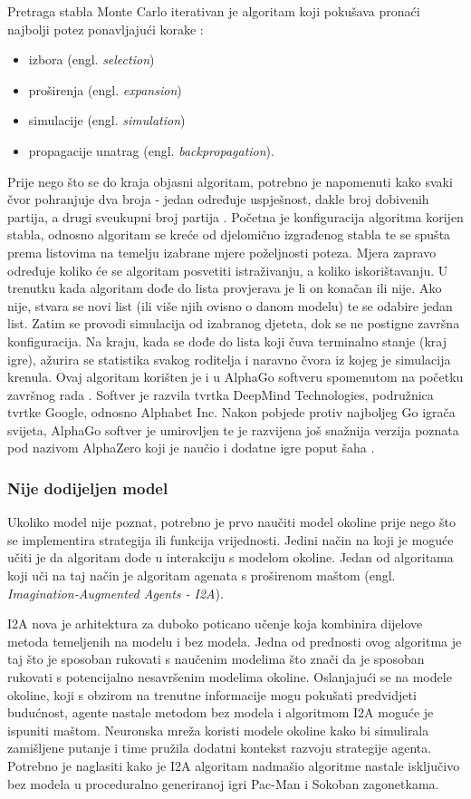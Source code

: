 \documentclass[]{foi} %
\begin{document}
Pretraga stabla Monte Carlo iterativan je algoritam koji pokušava pronaći najbolji potez ponavljajući korake \cite{mcts}:
\begin{itemize}
    \item izbora (engl. \textit{selection})
    \item proširenja (engl. \textit{expansion})
    \item simulacije (engl. \textit{simulation})
    \item propagacije unatrag (engl. \textit{backpropagation}).
\end{itemize}
Prije nego što se do kraja objasni algoritam, potrebno je napomenuti kako svaki čvor pohranjuje dva broja - jedan određuje uspješnost, dakle broj dobivenih partija, a drugi sveukupni broj partija \cite[str. 28]{ferMonte}. Početna je konfiguracija algoritma korijen stabla, odnosno algoritam se kreće od djelomično izgrađenog stabla te se spušta prema listovima na temelju izabrane mjere poželjnosti poteza. Mjera zapravo određuje koliko će se algoritam posvetiti istraživanju, a koliko iskorištavanju. U trenutku kada algoritam dođe do lista provjerava je li on konačan ili nije. Ako nije, stvara se novi list (ili više njih ovisno o danom modelu) te se odabire jedan list. Zatim se provodi simulacija od izabranog djeteta, dok se ne postigne završna konfiguracija. Na kraju, kada se dođe do lista koji čuva terminalno stanje (kraj igre), ažurira se statistika svakog roditelja i naravno čvora iz kojeg je simulacija krenula. Ovaj algoritam korišten je i u AlphaGo softveru spomenutom na početku završnog rada \cite{modeli}. Softver je razvila tvrtka DeepMind Technologies, podružnica tvrtke Google, odnosno Alphabet Inc. Nakon pobjede protiv najboljeg Go igrača svijeta, AlphaGo softver je umirovljen te je razvijena još snažnija verzija poznata pod nazivom AlphaZero koji je naučio i dodatne igre poput šaha \cite{alphaZero}.


\subsubsection{Nije dodijeljen model}
Ukoliko model nije poznat, potrebno je prvo naučiti model okoline prije nego što se implementira strategija ili funkcija vrijednosti. Jedini način na koji je moguće učiti je da algoritam dođe u interakciju s modelom okoline. Jedan od algoritama koji uči na taj način je algoritam agenata s proširenom maštom (engl. \textit{Imagination-Augmented Agents - I2A}). 

I2A nova je arhitektura za duboko poticano učenje koja kombinira dijelove metoda temeljenih na modelu i bez modela. Jedna od prednosti ovog algoritma je taj što je sposoban rukovati s naučenim modelima što znači da je sposoban rukovati s potencijalno nesavršenim modelima okoline. Oslanjajući se na modele okoline, koji s obzirom na trenutne informacije mogu pokušati predvidjeti budućnost, agente nastale metodom bez modela i algoritmom I2A moguće je ispuniti maštom. Neuronska mreža koristi modele okoline kako bi simulirala zamišljene putanje i time pružila dodatni kontekst razvoju strategije agenta. Potrebno je naglasiti kako je I2A algoritam nadmašio algoritme nastale isključivo bez modela u proceduralno generiranoj igri Pac-Man i Sokoban zagonetkama. \cite{i2a}
\end{document}
